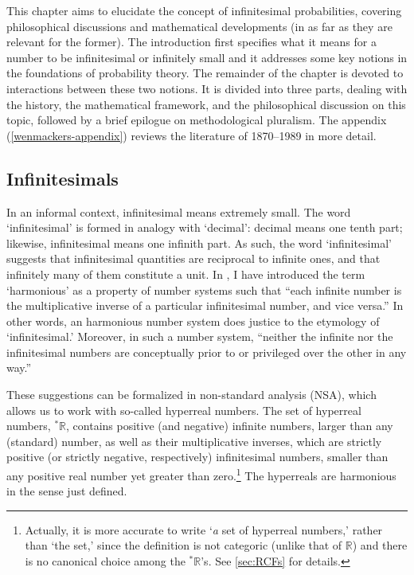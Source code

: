This chapter aims to elucidate the concept of infinitesimal probabilities, covering philosophical discussions and mathematical developments (in as far as they are relevant for the former).
The introduction first specifies what it means for a number to be infinitesimal or infinitely small and it addresses some key notions in the foundations of probability theory.
The remainder of the chapter is devoted to interactions between these two notions. It is divided into three parts, dealing with the history, the mathematical framework, and the philosophical discussion on this topic, followed by a brief epilogue on methodological pluralism. The appendix (\autoref{wenmackers-appendix}) reviews the literature of 1870--1989 in more detail.

\subsection*{Infinitesimals}\label{sec:infinitesimals}
In an informal context, infinitesimal means extremely small.
The word `infinitesimal' is formed in analogy with `decimal': decimal means one tenth part; likewise, infinitesimal means one infinith part. As such, the word `infinitesimal' suggests that infinitesimal quantities are reciprocal to infinite ones, and that infinitely many of them constitute a unit.
In \citet{Wenmackers:forthc}, I have introduced the term `harmonious' as a property of number systems such that ``each infinite number is the multiplicative inverse of a particular infinitesimal number, and vice versa.'' In other words, an harmonious number system does justice to the etymology of `infinitesimal.' Moreover, in such a number system, ``neither the infinite nor the infinitesimal numbers are conceptually prior to or privileged over the other in any way.''

These suggestions can be formalized in non-standard analysis (NSA), which allows us to work with so-called hyperreal numbers. The set of hyperreal numbers, ${^*} \mathbb{R}$, contains positive (and negative) infinite numbers, larger than any (standard) number, as well as their multiplicative inverses, which are strictly positive (or strictly negative, respectively) infinitesimal numbers, smaller than any positive real number yet greater than zero.\footnote{Actually, it is more accurate to write `\emph{a} set of hyperreal numbers,' rather than `the set,' since the definition is not categoric (unlike that of $\mathbb{R}$) and there is no canonical choice among the ${^*} \mathbb{R}$'s. See \autoref{sec:RCFs} for details.\label{fn:a-not-the}} The hyperreals are harmonious in the sense just defined.

